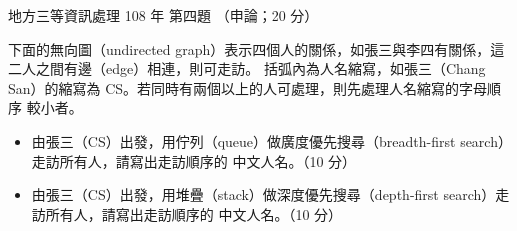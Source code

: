 \begin{pastexam}[label={px:df3-108-ds-04}]{地方三等資訊處理 108 年 第四題}
（申論；20 分）

下面的無向圖（undirected graph）表示四個人的關係，如張三與李四有關係，這二人之間有邊（edge）相連，則可走訪。
括弧內為人名縮寫，如張三（Chang San）的縮寫為 CS。若同時有兩個以上的人可處理，則先處理人名縮寫的字母順序
較小者。
\begin{center}
\end{center}
\begin{itemize}[leftmargin=2.2em]
\item[㈠] 由張三（CS）出發，用佇列（queue）做廣度優先搜尋（breadth-first search）走訪所有人，請寫出走訪順序的
中文人名。（10 分）
\item[㈡] 由張三（CS）出發，用堆疊（stack）做深度優先搜尋（depth-first search）走訪所有人，請寫出走訪順序的
中文人名。（10 分）
\end{itemize}
\end{pastexam}

